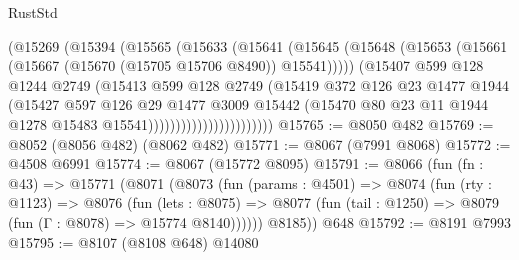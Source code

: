\begin{lexlean}{RustStd}
\begin{coremodule}
                              (@15269
                                (@15394
                                  (@15565
                                    (@15633
                                      (@15641
                                        (@15645
                                          (@15648
                                            (@15653
                                              (@15661
                                                (@15667 (@15670 (@15705 @15706 @8490)) @15541)))))
                                        (@15407
                                          @599
                                          @128
                                          @1244
                                          @2749
                                          (@15413
                                            @599
                                            @128
                                            @2749
                                            (@15419
                                              @372
                                              @126
                                              @23
                                              @1477
                                              @1944
                                              (@15427
                                                @597
                                                @126
                                                @29
                                                @1477
                                                @3009
                                                @15442
                                                (@15470
                                                  @80
                                                  @23
                                                  @11
                                                  @1944
                                                  @1278
                                                  @15483
                                                  @15541)))))))))))))))))))))))
@15765 := @8050 @482
@15769 := @8052 (@8056 @482) (@8062 @482)
@15771 := @8067 (@7991 @8068)
@15772 := @4508 @6991
@15774 := @8067 (@15772 @8095)
@15791 := @8066
    (fun (fn : @43) =>
    @15771
      (@8071
        (@8073
          (fun (params : @4501) =>
          @8074
            (fun (rty : @1123) =>
            @8076
              (fun (lets : @8075) =>
              @8077 (fun (tail : @1250) => @8079 (fun (Γ : @8078) => @15774 @8140))))))
        @8185))
    @648
@15792 := @8191 @7993
@15795 := @8107 (@8108 @648) @14080

\end{coremodule}
\end{lexlean}
